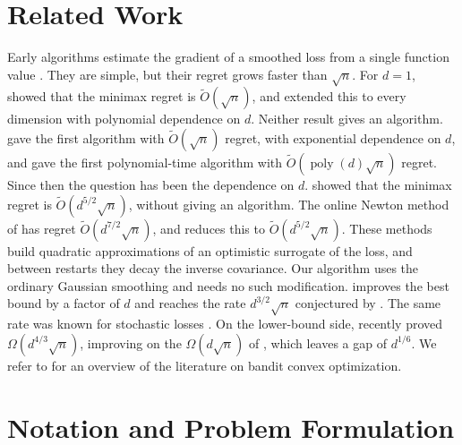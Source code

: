 \documentclass[12pt,cleveref]{jmlr}
\newcommand{\1}{\mathbf 1}
\newcommand{\tor}[1]{\todo[color=red!20,size=\tiny]{Tor: #1}}
\begin{document}
\section{Related Work}
\label{sec:related-work}
Early algorithms estimate the gradient of a smoothed loss from a single function value \citep{kleinberg2004nearly,flaxman2005online}. They are simple, but their regret grows faster than $\sqrt n$. For $d=1$, \citet{bubeck2015bandit} showed that the minimax regret is $\widetilde O(\sqrt n)$, and \citet{bubeck2016multi} extended this to every dimension with polynomial dependence on $d$. Neither result gives an algorithm. \citet{hazan2016optimal} gave the first algorithm with $\widetilde O(\sqrt n)$ regret,
with exponential dependence on $d$, and \citet{bubeck2017kernel} gave the first polynomial-time algorithm with $\widetilde O(\operatorname{poly}(d)\sqrt n)$ regret. Since then the question has been the dependence on $d$. \citet{lattimore2020improved} showed that the minimax regret is $\widetilde O(d^{5/2}\sqrt n)$, without giving an algorithm. The online Newton method of \citet{fokkema2024online} has regret $\widetilde O(d^{7/2}\sqrt n)$, and \citet[Chapter~11]{lattimore2026bandit} reduces this to $\widetilde O(d^{5/2}\sqrt n)$. These methods build quadratic approximations of an optimistic surrogate of the loss, and between restarts they decay the inverse covariance. Our algorithm uses the ordinary Gaussian smoothing and needs no such modification.  improves the best bound by a factor of $d$ and reaches the rate $d^{3/2}\sqrt n$ conjectured by \citet[Conjecture~1]{bubeck2017kernel}.
The same rate was known for stochastic losses \citep{fokkema2024online}. On the lower-bound side, \citet{rajaraman2026price} recently proved $\Omega(d^{4/3}\sqrt n)$, improving on the $\Omega(d\sqrt n)$ of \citet{dani2008stochastic}, which leaves a gap of $d^{1/6}$. We refer to \citet{lattimore2026bandit} for an overview of the literature on bandit convex optimization.

\section{Notation and Problem Formulation}
\label{sec:setting}
\end{document}
